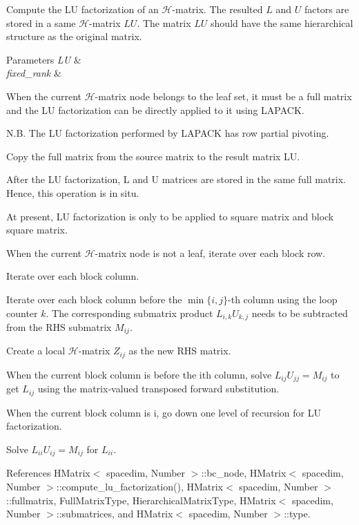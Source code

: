 Compute the LU factorization of an $\mathcal{H}$-\/matrix. The resulted $L$ and $U$ factors are stored in a same $\mathcal{H}$-\/matrix $LU$. The matrix $LU$ should have the same hierarchical structure as the original matrix.


\begin{DoxyParams}{Parameters}
{\em LU} & \\
\hline
{\em fixed\+\_\+rank} & \\
\hline
\end{DoxyParams}
When the current $\mathcal{H}$-\/matrix node belongs to the leaf set, it must be a full matrix and the LU factorization can be directly applied to it using L\+A\+P\+A\+CK.

N.\+B. The LU factorization performed by L\+A\+P\+A\+CK has row partial pivoting.

Copy the full matrix from the source matrix to the result matrix {\ttfamily LU}.

After the LU factorization, L and U matrices are stored in the same full matrix. Hence, this operation is in situ.

At present, LU factorization is only to be applied to square matrix and block square matrix.

When the current $\mathcal{H}$-\/matrix node is not a leaf, iterate over each block row.

Iterate over each block column.

Iterate over each block column before the $\min\{i, j\}$-\/th column using the loop counter $k$. The corresponding submatrix product $L_{i,k}U_{k,j}$ needs to be subtracted from the R\+HS submatrix $M_{ij}$.

Create a local $\mathcal{H}$-\/matrix $Z_{ij}$ as the new R\+HS matrix.

When the current block column is before the i\textquotesingle{}th column, solve $L_{ij} U_{jj}=M_{ij}$ to get $L_{ij}$ using the matrix-\/valued transposed forward substitution.

When the current block column is i, go down one level of recursion for LU factorization.

Solve $L_{ii}U_{ij}=M_{ij}$ for $L_{ii}$.

References H\+Matrix$<$ spacedim, Number $>$\+::bc\+\_\+node, H\+Matrix$<$ spacedim, Number $>$\+::compute\+\_\+lu\+\_\+factorization(), H\+Matrix$<$ spacedim, Number $>$\+::fullmatrix, Full\+Matrix\+Type, Hierarchical\+Matrix\+Type, H\+Matrix$<$ spacedim, Number $>$\+::submatrices, and H\+Matrix$<$ spacedim, Number $>$\+::type.



